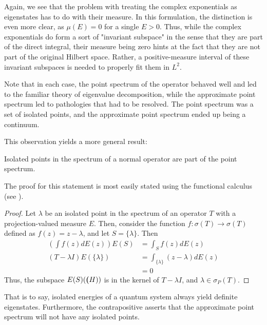 Again, we see that the problem with treating the complex exponentials as
eigenstates has to do with their measure. In this formulation, the distinction
is even more clear, as $\mu(E)=0$ for a single $E>0$. Thus, while the complex
exponentials do form a sort of "invariant subspace" in the sense that they are
part of the direct integral, their measure being zero hints at the fact that
they are not part of the original Hilbert space. Rather, a positive-measure
interval of these invariant subspaces is needed to properly fit them in $L^2$.

Note that in each case, the point spectrum of the operator behaved well and led
to the familiar theory of eigenvalue decomposition, while the approximate point
spectrum led to pathologies that had to be resolved. The point spectrum was a
set of isolated points, and the approximate point spectrum ended up being a
continuum.

This observation yields a more general result:
\begin{theorem}
    Isolated points in the spectrum of a normal operator are part of the point
    spectrum.
\end{theorem}
The proof for this statement is most easily stated using the functional calculus
(see \cite[p. 140-143]{MacCluer2009}).
\begin{proof}
    Let $\lambda$ be an isolated point in the spectrum of an operator $T$ with a
    projection-valued measure $E$. Then,
    consider the function $f:\sigma(T)\to\sigma(T)$ defined as $f(z) =
    z-\lambda$, and let $S=\{\lambda\}$. Then
    \[
        \begin{aligned}
            \left(\int f(z)dE(z)\right) E(S) &= \int_S f(z)dE(z)\\
            (T-\lambda I)E(\{\lambda\}) &= \int_{\{\lambda\}}(z-\lambda)dE(z)\\
                                        &= 0
        \end{aligned}
    \]
    Thus, the subspace $E(S)(\textbf(H))$ is in the kernel of $T-\lambda I$, and
    $\lambda\in\sigma_P(T)$.
\end{proof}

That is to say, isolated energies of a quantum system always yield definite
eigenstates. Furthermore, the contrapositive asserts that the approximate point
spectrum will not have any isolated points.
